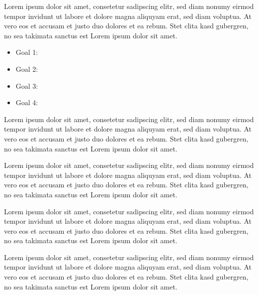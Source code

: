 \begin{answer}
  Lorem ipsum dolor sit amet, consetetur sadipscing elitr, sed diam nonumy
  eirmod tempor invidunt ut labore et dolore magna aliquyam erat, sed diam
  voluptua. At vero eos et accusam et justo duo dolores et ea rebum. Stet clita
  kasd gubergren, no sea takimata sanctus est Lorem ipsum dolor sit amet.
\end{answer}

\afternoon

\begin{status}
  \begin{itemize}
    \item Goal 1: 
    \item Goal 2: 
    \item Goal 3: 
    \item Goal 4: 
  \end{itemize}
\end{status}


\begin{thought}
  Lorem ipsum dolor sit amet, consetetur sadipscing elitr, sed diam nonumy
  eirmod tempor invidunt ut labore et dolore magna aliquyam erat, sed diam
  voluptua. At vero eos et accusam et justo duo dolores et ea rebum. Stet clita
  kasd gubergren, no sea takimata sanctus est Lorem ipsum dolor sit amet.
\end{thought}

\begin{idea}
  Lorem ipsum dolor sit amet, consetetur sadipscing elitr, sed diam nonumy
  eirmod tempor invidunt ut labore et dolore magna aliquyam erat, sed diam
  voluptua. At vero eos et accusam et justo duo dolores et ea rebum. Stet clita
  kasd gubergren, no sea takimata sanctus est Lorem ipsum dolor sit amet.
\end{idea}


\begin{claim}
  Lorem ipsum dolor sit amet, consetetur sadipscing elitr, sed diam nonumy
  eirmod tempor invidunt ut labore et dolore magna aliquyam erat, sed diam
  voluptua. At vero eos et accusam et justo duo dolores et ea rebum. Stet clita
  kasd gubergren, no sea takimata sanctus est Lorem ipsum dolor sit amet.
\end{claim}

\begin{remark}
  Lorem ipsum dolor sit amet, consetetur sadipscing elitr, sed diam nonumy
  eirmod tempor invidunt ut labore et dolore magna aliquyam erat, sed diam
  voluptua. At vero eos et accusam et justo duo dolores et ea rebum. Stet clita
  kasd gubergren, no sea takimata sanctus est Lorem ipsum dolor sit amet.
\end{remark}

